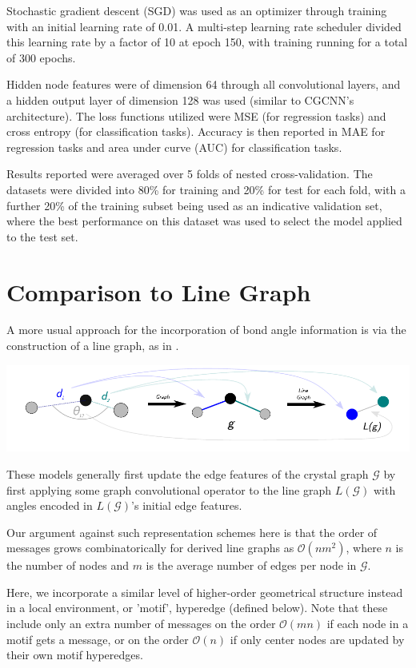 \documentclass[]{article}
\begin{document}
Stochastic gradient descent (SGD) was used as an optimizer through training with an initial learning rate of 0.01. A multi-step learning rate scheduler divided this learning rate by a factor of 10 at epoch 150, with training running for a total of 300 epochs.  

Hidden node features were of dimension 64 through all convolutional layers, and a hidden output layer of dimension 128 was used (similar to CGCNN's architecture). The loss functions utilized were MSE (for regression tasks) and cross entropy (for classification tasks). Accuracy is then reported in MAE for regression tasks and area under curve (AUC) for classification tasks. 

Results reported were averaged over 5 folds of nested cross-validation. The datasets were divided into 80\% for training and 20\% for test for each fold, with a further 20\% of the training subset being used as an indicative validation set, where the best performance on this dataset was used to select the model applied to the test set. 


\section{Comparison to Line Graph}
A more usual approach for the incorporation of bond angle information is via the construction of a line graph, as in \cite{alignn, m3gnet}. 
\begin{center}
	\includegraphics[scale=0.72]{line_graph_ex.pdf}
\end{center}
These models generally first update the edge features of the crystal graph $\mathcal{G}$ by first applying some graph convolutional operator to the line graph $L(\mathcal{G})$ with angles encoded in  $L(\mathcal{G})$'s initial edge features.

Our argument against such representation schemes here is that the order of messages grows combinatorically for derived line graphs as $\mathcal{O}(nm^2)$, where $n$ is the number of nodes and $m$ is the average number of edges per node in $\mathcal{G}$.

Here, we incorporate a similar level of higher-order geometrical structure instead in a local environment, or 'motif', hyperedge (defined below). Note that these include only an extra number of messages on the order $\mathcal{O}(mn)$ if each node in a motif gets a message, or on the order $\mathcal{O}(n)$ if only center nodes are updated by their own motif hyperedges.
\end{document}
